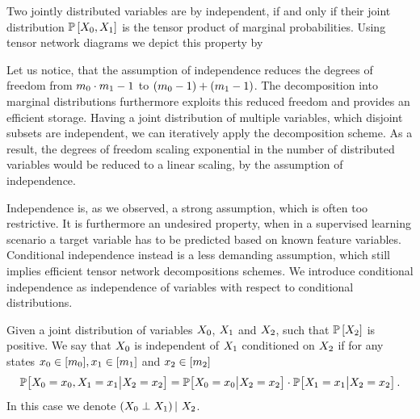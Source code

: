 Two jointly distributed variables are by  independent, if and only if their joint distribution $\mathbb{P}\left[X_{0},X_{1}\right]$ is the tensor product of marginal probabilities.
Using tensor network diagrams we depict this property by
\begin{center}
    
\end{center}
Let us notice, that the assumption of independence reduces the degrees of freedom from $m_{0}\cdot m_{1}-1$ to $(m_{0}-1)+(m_{1}-1)$.
The decomposition into marginal distributions furthermore exploits this reduced freedom and provides an efficient storage.
Having a joint distribution of multiple variables, which disjoint subsets are independent, we can iteratively apply the decomposition scheme.
As a result, the degrees of freedom scaling exponential in the number of distributed variables would be reduced to a linear scaling, by the assumption of independence.

Independence is, as we observed, a strong assumption, which is often too restrictive.
It is furthermore an undesired property, when in a supervised learning scenario a target variable has to be predicted based on known feature variables.
Conditional independence instead is a less demanding assumption, which still implies efficient tensor network decompositions schemes.
We introduce conditional independence as independence of variables with respect to conditional distributions.

\begin{definition}
    \label{def:condIndependence}
    Given a joint distribution of variables $X_{0}$, $X_{1}$ and $X_{2}$, such that $\mathbb{P}\left[X_{2}\right]$ is positive.
    We say that $X_{0}$ is independent of $X_{1}$ conditioned on $X_{2}$ if for any states $x_{0}\in[m_{0}],x_{1}\in[m_{1}]$ and $x_{2}\in[m_{2}]$
    \begin{align*}
        \mathbb{P}\big[X_{0}=x_{0},X_{1}=x_{1}\big|X_{2}=x_{2}\big]
        = \mathbb{P}\big[X_{0}=x_{0}\big|X_{2}=x_{2}\big]
        \cdot \mathbb{P}\big[X_{1}=x_{1}\big|X_{2}=x_{2}\big]   \, .
    \end{align*}
    In this case we denote $\left(X_{0}\perp X_{1}\middle)\,\right|\,X_{2}$.
\end{definition}


